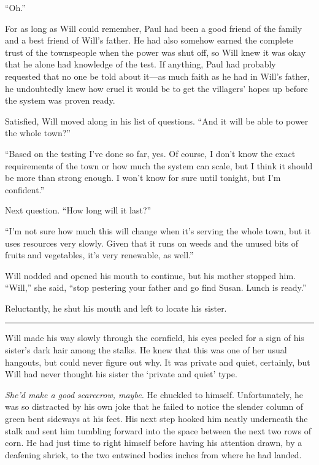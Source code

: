 \documentclass[12pt,letterpaper,oneside,english]{book}
\begin{document}
``Oh.''

For as long as Will could remember, Paul had been a good friend of the
family and a best friend of Will's father. He had also somehow earned
the complete trust of the townspeople when the power was shut off, so
Will knew it was okay that he alone had knowledge of the test. If
anything, Paul had probably requested that no one be told about it---as
much faith as he had in Will's father, he undoubtedly knew how cruel it
would be to get the villagers' hopes up before the system was proven
ready.

Satisfied, Will moved along in his list of questions. ``And it will be
able to power the whole town?''

``Based on the testing I've done so far, yes. Of course, I don't know
the exact requirements of the town or how much the system can scale, but
I think it should be more than strong enough. I won't know for sure
until tonight, but I'm confident.''

Next question. ``How long will it last?''

``I'm not sure how much this will change when it's serving the whole
town, but it uses resources very slowly. Given that it runs on weeds and
the unused bits of fruits and vegetables, it's very renewable, as
well.''

Will nodded and opened his mouth to continue, but his mother stopped
him. ``Will,'' she said, ``stop pestering your father and go find
Susan. Lunch is ready.''

Reluctantly, he shut his mouth and left to locate his sister.

\medskip
{\centering\rule{\linewidth}{1pt}}
\smallskip

Will made his way slowly through the cornfield, his eyes peeled for a
sign of his sister's dark hair among the stalks. He knew that this was
one of her usual hangouts, but could never figure out why. It was
private and quiet, certainly, but Will had never thought his sister the
`private and quiet' type.

\textit{She'd make a good scarecrow, maybe.} He chuckled to himself.
Unfortunately, he was so distracted by his own joke that he failed to
notice the slender column of green bent sideways at his feet. His next
step hooked him neatly underneath the stalk and sent him tumbling
forward into the space between the next two rows of corn. He had just
time to right himself before having his attention drawn, by a deafening
shriek, to the two entwined bodies inches from where he had landed.
\end{document}
